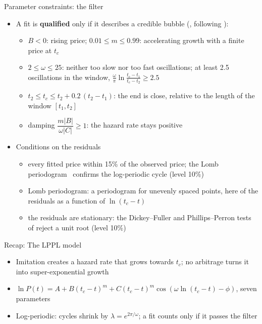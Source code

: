 \begin{frame}{Parameter constraints: the filter}
\itemsize{\footnotesize}
\begin{itemize}
    \item A fit is \textbf{qualified} only if it describes a credible bubble (, following ):
    \begin{itemize}
        \item $B < 0$: rising price; $0.01 \le m \le 0.99$: accelerating growth with a finite price at $t_c$
        \item $2 \le \omega \le 25$: neither too slow nor too fast oscillations; at least 2.5 oscillations in the window, $\frac{\omega}{\pi}\ln\frac{t_c - t_1}{t_c - t_2} \ge 2.5$
        \item $t_2 \le t_c \le t_2 + 0.2\,(t_2 - t_1)$: the end is close, relative to the length of the window $[t_1, t_2]$
        \item damping $\dfrac{m|B|}{\omega|C|} \ge 1$: the hazard rate stays positive
    \end{itemize}
    \item Conditions on the residuals
    \begin{itemize}
        \item every fitted price within 15\% of the observed price; the Lomb periodogram \ confirms the log-periodic cycle (level 10\%)
        \item Lomb periodogram: a periodogram for unevenly spaced points, here of the residuals as a function of $\ln(t_c - t)$
        \item the residuals are stationary: the Dickey--Fuller and Phillips--Perron tests of  reject a unit root (level 10\%)
    \end{itemize}
\end{itemize}
\end{frame}

\begin{frame}{Recap: The LPPL model}
\itemsize{\small}
\begin{itemize}
    \item Imitation creates a hazard rate that grows towards $t_c$; no arbitrage turns it into super-exponential growth
    \item $\ln P(t) = A + B(t_c - t)^m + C(t_c - t)^m\cos(\omega\ln(t_c - t) - \phi)$, seven parameters
    \item Log-periodic: cycles shrink by $\lambda = e^{2\pi/\omega}$; a fit counts only if it passes the filter
\end{itemize}
\end{frame}


